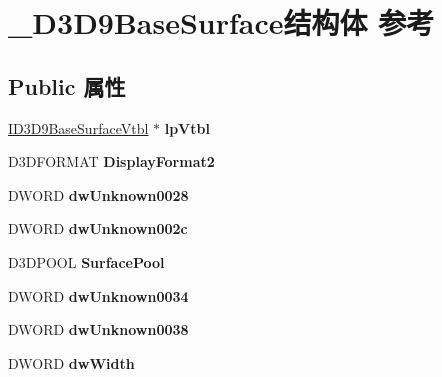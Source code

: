 \hypertarget{struct___d3_d9_base_surface}{}\section{\+\_\+\+D3\+D9\+Base\+Surface结构体 参考}
\label{struct___d3_d9_base_surface}
\subsection*{Public 属性}
\begin{DoxyCompactItemize}
\item 
\mbox{\label{struct___d3_d9_base_surface_a44d3b85457636837154a9c2ca0382006}} 
\hyperlink{struct___d3_d9_base_surface_vtbl}{I\+D3\+D9\+Base\+Surface\+Vtbl} $\ast$ {\bfseries lp\+Vtbl}
\item 
\mbox{\label{struct___d3_d9_base_surface_a42f156d4b4d6c29c0eb6f461f2ec4135}} 
D3\+D\+F\+O\+R\+M\+AT {\bfseries Display\+Format2}
\item 
\mbox{\label{struct___d3_d9_base_surface_a31d200415d8410c1c706d729a3985e82}} 
D\+W\+O\+RD {\bfseries dw\+Unknown0028}
\item 
\mbox{\label{struct___d3_d9_base_surface_a737524daf101fd48be2f76ed13e40fa7}} 
D\+W\+O\+RD {\bfseries dw\+Unknown002c}
\item 
\mbox{\label{struct___d3_d9_base_surface_aa80c58ce5e4f2bc4f26dd3dd5b18625d}} 
D3\+D\+P\+O\+OL {\bfseries Surface\+Pool}
\item 
\mbox{\label{struct___d3_d9_base_surface_a06d112209316528912b1f15ffa85db2b}} 
D\+W\+O\+RD {\bfseries dw\+Unknown0034}
\item 
\mbox{\label{struct___d3_d9_base_surface_a56b1120c0661f767e52c2894051dfba7}} 
D\+W\+O\+RD {\bfseries dw\+Unknown0038}
\item 
\mbox{\label{struct___d3_d9_base_surface_aefbcceb01e2b4855535f0badf60250fa}} 
D\+W\+O\+RD {\bfseries dw\+Width}

\end{DoxyCompactItemize}
